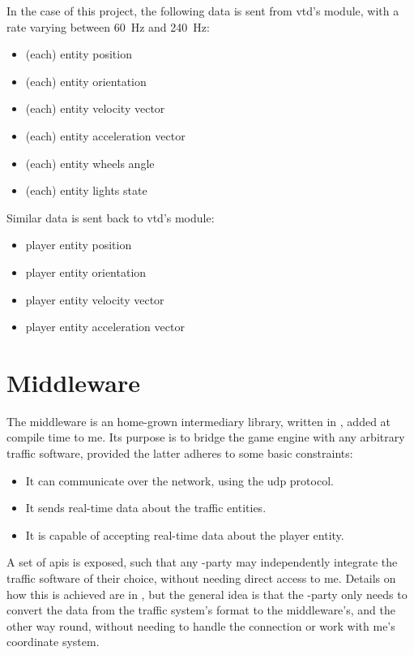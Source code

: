 

In the case of this project, the following data is sent from \gls{vtd}'s  module, with a rate varying between \SI{60}{\hertz} and \SI{240}{\hertz}:

\begin{itemize}
	\item (each) entity position
	\item (each) entity orientation
	\item (each) entity velocity vector
	\item (each) entity acceleration vector
	\item (each) entity wheels angle
	\item (each) entity lights state
\end{itemize}

Similar data is sent back to \gls{vtd}'s  module:

\begin{itemize}
	\item player entity position
	\item player entity orientation
	\item player entity velocity vector
	\item player entity acceleration vector
\end{itemize}

\section{Middleware}\label{sc:software:middleware}

The middleware is an home-grown intermediary library, written in ,  added at compile time to \gls{me}. Its purpose is to bridge the game engine with any arbitrary traffic software, provided the latter adheres to some basic constraints:

\begin{itemize}
	\item It can communicate over the network, using the \gls{udp} protocol.
	\item It sends real-time data about the traffic entities.
	\item It is capable of accepting real-time data about the player entity.
\end{itemize}

A set of \glspl{api} is exposed, such that any -party may independently integrate the traffic software of their choice, without needing direct access to \gls{me}. Details on how this is achieved are in , but the general idea is that the -party only needs to convert the data from the traffic system's format to the \gls{middleware}'s, and the other way round, without needing to handle the connection or work with \gls{me}'s coordinate system.

